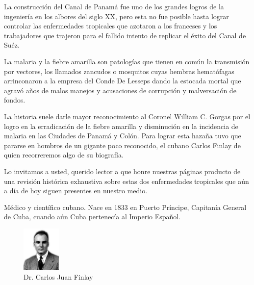 \documentclass[a4paper]{article}
\date{\today}
\let\cite=\supercite
\begin{document}
\maketitle

\begin{multicols}{3}



La construcción del Canal de Panamá fue uno de los grandes logros de la
ingeniería en los albores del siglo XX, pero esta no fue posible hasta lograr
controlar las enfermedades tropicales que azotaron a los franceses y los
trabajadores que trajeron para el fallido intento de replicar el éxito
del Canal de Suéz.

La malaria y la fiebre amarilla son patologías que tienen en común la
transmisión por vectores, los llamados zancudos o mosquitos cuyas hembras
hematófagas arrinconaron a la empresa del Conde De Lesseps dando la estocada
mortal que agravó años de malos manejos y acusaciones de corrupción y
malversación de fondos.

La historia suele darle mayor reconocimiento al Coronel William C. Gorgas por
el logro en la erradicación de la fiebre amarilla y disminución en la
incidencia de malaria en las Ciudades de Panamá y Colón. Para lograr esta
hazaña tuvo que pararse en hombros de un gigante poco reconocido, el
cubano Carlos Finlay de quien recorreremos algo de su biografía.

Lo invitamos a usted, querido lector a que honre nuestras páginas
producto de una revisión histórica exhaustiva sobre estas dos enfermedades
tropicales que aún a día de hoy siguen presentes en nuestro medio.

\closearticle



Médico y científico cubano. Nace en 1833 en Puerto Príncipe, Capitanía
General de Cuba, cuando aún Cuba pertenecía al Imperio Español\cite{biojcf}.

\begin{figure}
	\begin{center}
		\vspace{-10pt}
		\includegraphics[width=0.17\textwidth]{trdawber.jpg}
	\end{center}
	\caption*{Dr. Carlos Juan Finlay}
\end{figure}


\end{multicols}
\end{document}
